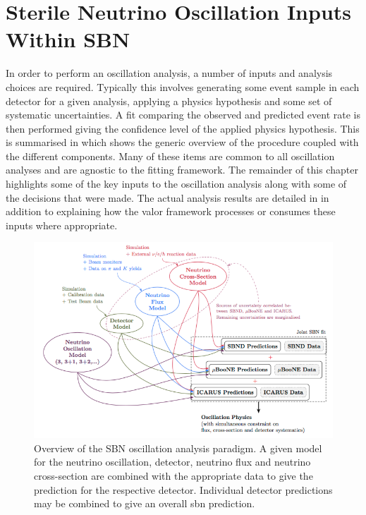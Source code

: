 \chapter{Sterile Neutrino Oscillation Inputs Within SBN}
\label{chap:osc_inputs}

In order to perform an oscillation analysis, a number of inputs and analysis choices are required. Typically this involves generating some event sample in each detector for a given analysis, applying a physics hypothesis and some set of systematic uncertainties. A fit comparing the observed and predicted event rate is then performed giving the confidence level of the applied physics hypothesis. This is summarised in  which shows the generic overview of the procedure coupled with the different components. Many of these items are common to all oscillation analyses and are agnostic to the fitting framework. The remainder of this chapter highlights some of the key inputs to the oscillation analysis along with some of the decisions that were made. The actual analysis results are detailed in  in addition to explaining how the \gls{valor} framework processes or consumes these inputs where appropriate.

\begin{figure}[!h]
    \centering
    \includegraphics[width = \largefigwidth]{figures-chap5/valor_analysis.png}
    \caption[SBN Oscillation analysis paradigm.]{Overview of the SBN oscillation analysis paradigm. A given model for the neutrino oscillation, detector, neutrino flux and neutrino cross-section are combined with the appropriate data to give the prediction for the respective detector. Individual detector predictions may be combined to give an overall \gls{sbn} prediction. }
    \label{fig:analysis_paradigm}
\end{figure}

